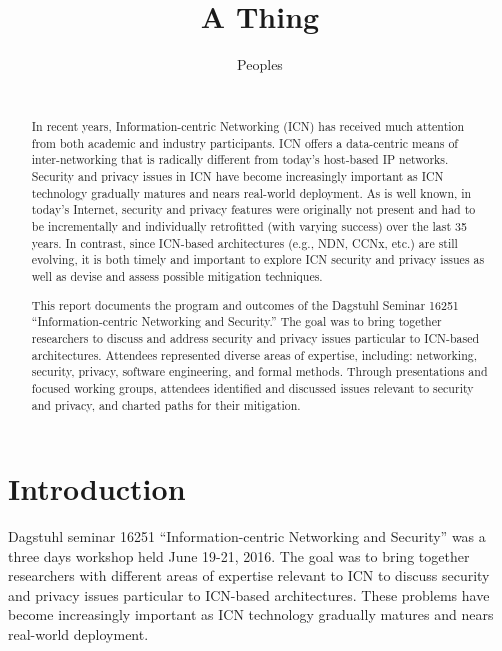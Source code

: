 \documentclass{sig-alternate-10pt}
\begin{document}
\title{A Thing}

\author{
\alignauthor
Peoples \\
\\
}

\maketitle

\begin{abstract}
In recent years, Information-centric Networking (ICN) has received much attention from
both academic and industry participants. ICN offers a data-centric means of inter-networking
that is radically different from today's host-based IP networks. Security and privacy issues
in ICN have become increasingly important as ICN technology gradually matures and nears
real-world deployment. As is well known, in today's Internet, security and privacy features
were originally not present and had to be incrementally and individually retrofitted
(with varying success) over the last 35 years. In contrast, since ICN-based architectures
(e.g., NDN, CCNx, etc.) are still evolving, it is both timely and important to explore
ICN security and privacy issues as well as devise and assess possible mitigation techniques.

This report documents the program and outcomes of the Dagstuhl Seminar 16251
``Information-centric Networking and Security.'' The goal was to bring together
researchers to discuss and address security and privacy issues particular to ICN-based
architectures. Attendees represented diverse areas of expertise, including: networking,
security, privacy, software engineering, and formal methods. Through presentations and
focused working groups, attendees identified and discussed issues relevant to security
and privacy, and charted paths for their mitigation.
\end{abstract}

\section{Introduction}
Dagstuhl seminar 16251 ``Information-centric Networking and Security'' was a three days
workshop held June 19-21, 2016. The goal was to bring together researchers with
different areas of expertise relevant to ICN to discuss security and privacy issues
particular to ICN-based architectures. These problems have become increasingly
important as ICN technology gradually matures and nears real-world deployment.
\end{document}
